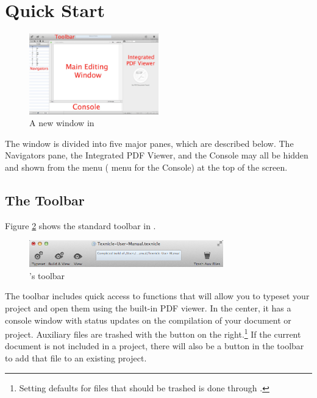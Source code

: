 \section{Quick Start}
\label{userguide.quickstart}
\begin{figure}[htbp]
\centering
\includegraphics[width=0.5\textwidth]{TeXnicle-Images/texnicle-window.jpg}
\caption{A new window in \texnicle}
\label{fig:texnicle-newproject}
\end{figure}

The \texnicle window is divided into five major panes, which are described below. The Navigators pane, the Integrated PDF Viewer, and the Console may all be hidden and shown from the  menu ( menu for the Console) at the top of the screen.

\subsection{The Toolbar}
\label{userguide.quickstart.toolbar}
Figure \ref{fig:texnicle-toolbar} shows the standard toolbar in \texnicle.
\begin{figure}[htbp]
\centering
\includegraphics[width=0.75\textwidth]{TeXnicle-Images/texnicle-toolbar.png}
\caption{\texnicle's toolbar}
\label{fig:texnicle-toolbar}
\end{figure}

The toolbar includes quick access to functions that will allow you to typeset your project and open them using the built-in PDF viewer. In the center, it has a console window with status updates on the compilation of your document or project. Auxiliary files are trashed with the button on the right.\footnote{Setting defaults for files that should be trashed is done through .} If the current document is not included in a project, there will also be a button in the toolbar to add that file to an existing project.

